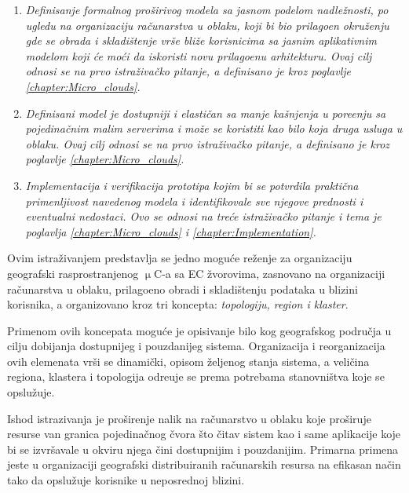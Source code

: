 \begin{enumerate}[start=1,label={(\bfseries \arabic*)}]
	\item \textit{Definisanje formalnog pro\v sirivog modela sa jasnom podelom nadle\v znosti, po ugledu na organizaciju ra\v cunarstva u oblaku, koji bi bio prilago\dj en okru\v zenju gde se obrada i skladi\v stenje vrše bli\v ze korisnicima sa jasnim aplikativnim modelom koji \'ce mo\'ci da iskoristi novu prilago\dj enu arhitekturu. Ovaj cilj odnosi se na prvo istra\v ziva\v cko pitanje, a definisano je kroz poglavlje \ref{chapter:Micro_clouds}.}
	\item \textit{Definisani model je dostupniji i elasti\v can sa manje ka\v snjenja u pore\dj enju sa pojedina\v cnim malim serverima i mo\v ze se koristiti kao bilo koja druga usluga u oblaku. Ovaj cilj odnosi se na prvo istra\v ziva\v cko pitanje, a definisano je kroz poglavlje \ref{chapter:Micro_clouds}.}
	\item \textit{Implementacija i verifikacija prototipa kojim bi se potvrdila prakti\v cna primenljivost navedenog modela i identifikovale sve njegove prednosti i eventualni nedostaci. Ovo se odnosi na tre\'ce istra\v ziva\v cko pitanje i tema je poglavlja \ref{chapter:Micro_clouds} i \ref{chapter:Implementation}.}
\end{enumerate}

\noindent
Ovim istra\v zivanjem predstavlja se jedno mogu\'ce re\v zenje za organizaciju geografski rasprostranjenog $\upmu$C-a sa EC \v zvorovima, zasnovano na organizaciji ra\v cunarstva u oblaku, prilago\dj eno obradi i skladi\v stenju podataka u blizini korisnika, a organizovano kroz tri koncepta: \emph{topologiju, region i klaster}. 

Primenom ovih koncepata mogu\'ce je opisivanje bilo kog geografskog podru\v cja u cilju dobijanja dostupnijeg i pouzdanijeg sistema. Organizacija i reorganizacija ovih elemenata vr\v si se dinami\v cki, opisom \v zeljenog stanja sistema, a veli\v cina regiona, klastera i topologija odre\dj uje se prema potrebama stanovni\v stva koje se opslu\v zuje.

Ishod istrazivanja je pro\v sirenje nalik na ra\v cunarstvo u oblaku koje pro\v siruje resurse van granica pojedina\v cnog \v cvora \v sto \v citav sistem kao i same aplikacije koje bi se izvr\v savale u okviru njega \v cini dostupnijim i pouzdanijim. Primarna primena jeste u organizaciji geografski distribuiranih ra\v cunarskih resursa na efikasan na\v cin tako da opslu\v zuje korisnike u neposrednoj blizini. 

